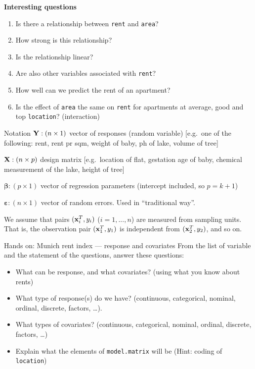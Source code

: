 \documentclass[
  ignorenonframetext,
]{beamer}
\providecommand{\tightlist}{%
  \setlength{\itemsep}{0pt}\setlength{\parskip}{0pt}}
\begin{document}
\begin{frame}[fragile]
\textbf{Interesting questions}

\begin{enumerate}
\tightlist
\item
  Is there a relationship between \texttt{rent} and \texttt{area}?
\item
  How strong is this relationship?
\item
  Is the relationship linear?
\item
  Are also other variables associated with \texttt{rent}?
\item
  How well can we predict the rent of an apartment?
\item
  Is the effect of \texttt{area} the same on \texttt{rent} for
  apartments at average, good and top \texttt{location}? (interaction)
\end{enumerate}
\end{frame}

\begin{frame}{Notation}
\label{notation}
\({\bf Y}: (n \times 1)\) vector of responses (random variable)
{[}e.g.~one of the following: rent, rent pr sqm, weight of baby, ph of
lake, volume of tree{]}

\({\bf X}: (n \times p)\) design matrix {[}e.g.~location of flat,
gestation age of baby, chemical measurement of the lake, height of
tree{]}

\(\boldsymbol{\beta}: (p \times 1)\) vector of regression parameters
(intercept included, so \(p=k+1\))

\(\boldsymbol{\varepsilon}: (n\times 1)\) vector of random errors. Used
in ``traditional way''.

We assume that pairs \(({\bf x}_i^T,y_i)\) (\(i=1,...,n\)) are measured
from sampling units. That is, the observation pair \(({\bf x}_1^T,y_1)\)
is independent from \(({\bf x}_2^T,y_2)\), and so on.
\end{frame}

\begin{frame}[fragile]
\begin{block}{Hands on: Munich rent index --- response and covariates}
\label{hands-on-munich-rent-index-response-and-covariates}
From the list of variable and the statement of the questions, answer
these questions:

\begin{itemize}
\tightlist
\item
  {What can be response, and what covariates? (using what you know about
  rents)}
\item
  {What type of response(s) do we have? (continuous, categorical,
  nominal, ordinal, discrete, factors, \ldots). }
\item
  {What types of covariates? (continuous, categorical, nominal, ordinal,
  discrete, factors, \ldots) }
\item
  {Explain what the elements of \texttt{model.matrix} will be (Hint:
  coding of \texttt{location}) }
\end{itemize}
\end{block}
\end{frame}
\end{document}
